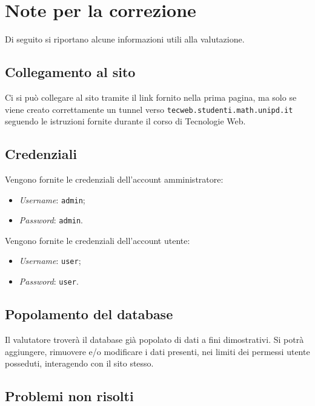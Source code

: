 \section{Note per la correzione}

Di seguito si riportano alcune informazioni utili alla valutazione.

\subsection{Collegamento al sito}
Ci si può collegare al sito tramite il link fornito nella prima pagina, ma
solo se viene creato correttamente un tunnel verso
\texttt{tecweb.studenti.math.unipd.it} seguendo le istruzioni fornite durante
il corso di Tecnologie Web.

\subsection{Credenziali}
Vengono fornite le credenziali dell'account amministratore:
\begin{itemize}
	\item \textit{Username}: \texttt{admin};
	\item \textit{Password}: \texttt{admin}.
\end{itemize}
Vengono fornite le credenziali dell'account utente:
\begin{itemize}
	\item \textit{Username}: \texttt{user};
	\item \textit{Password}: \texttt{user}.
\end{itemize}

\subsection{Popolamento del database}
Il valutatore troverà il database già popolato di dati a fini dimostrativi.
Si potrà aggiungere, rimuovere e/o modificare i dati presenti, nei limiti dei
permessi utente posseduti, interagendo con il sito stesso.

\subsection{Problemi non risolti}
